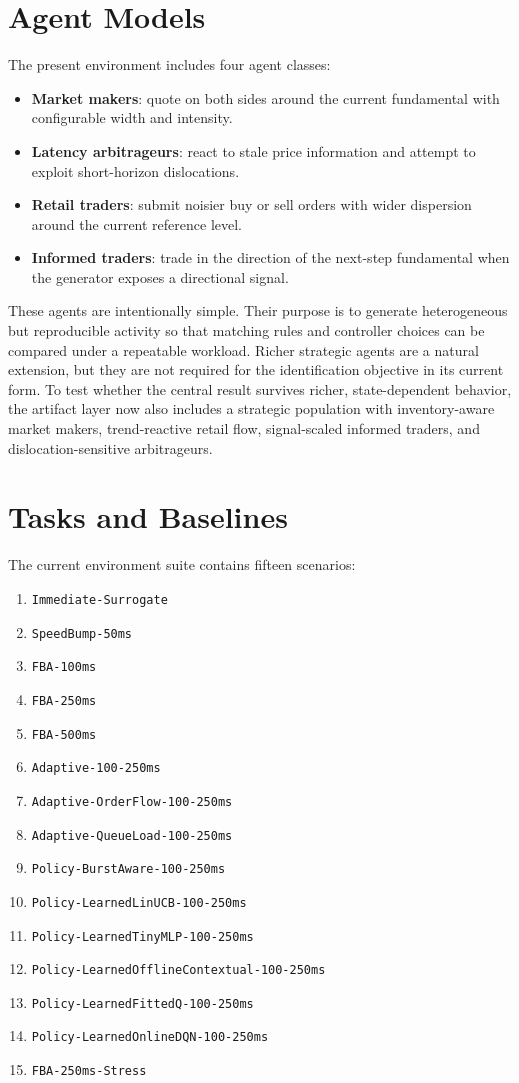 \documentclass[11pt]{article}
\begin{document}
\section{Agent Models}
The present environment includes four agent classes:
\begin{itemize}[leftmargin=*]
  \item \textbf{Market makers}: quote on both sides around the current fundamental with configurable width and intensity.
  \item \textbf{Latency arbitrageurs}: react to stale price information and attempt to exploit short-horizon dislocations.
  \item \textbf{Retail traders}: submit noisier buy or sell orders with wider dispersion around the current reference level.
  \item \textbf{Informed traders}: trade in the direction of the next-step fundamental when the generator exposes a directional signal.
\end{itemize}
These agents are intentionally simple. Their purpose is to generate heterogeneous but reproducible activity so that matching rules and controller choices can be compared under a repeatable workload. Richer strategic agents are a natural extension, but they are not required for the identification objective in its current form. To test whether the central result survives richer, state-dependent behavior, the artifact layer now also includes a strategic population with inventory-aware market makers, trend-reactive retail flow, signal-scaled informed traders, and dislocation-sensitive arbitrageurs.

\section{Tasks and Baselines}
The current environment suite contains fifteen scenarios:
\begin{enumerate}[leftmargin=*]
  \item \texttt{Immediate-Surrogate}
  \item \texttt{SpeedBump-50ms}
  \item \texttt{FBA-100ms}
  \item \texttt{FBA-250ms}
  \item \texttt{FBA-500ms}
  \item \texttt{Adaptive-100-250ms}
  \item \texttt{Adaptive-OrderFlow-100-250ms}
  \item \texttt{Adaptive-QueueLoad-100-250ms}
  \item \texttt{Policy-BurstAware-100-250ms}
  \item \texttt{Policy-LearnedLinUCB-100-250ms}
  \item \texttt{Policy-LearnedTinyMLP-100-250ms}
  \item \texttt{Policy-LearnedOfflineContextual-100-250ms}
  \item \texttt{Policy-LearnedFittedQ-100-250ms}
  \item \texttt{Policy-LearnedOnlineDQN-100-250ms}
  \item \texttt{FBA-250ms-Stress}
\end{enumerate}
\end{document}
